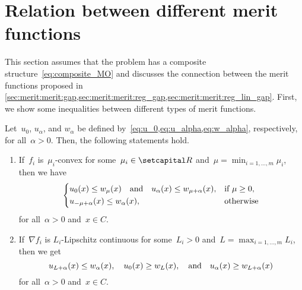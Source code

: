 \documentclass[../main]{subfiles}
\begin{document}
\section{Relation between different merit functions}
This section assumes that the problem has a composite structure~\cref{eq:composite_MO} and discusses the connection between the merit functions proposed in \cref{sec:merit:merit:gap,sec:merit:merit:reg_gap,sec:merit:merit:reg_lin_gap}.
First, we show some inequalities between different types of merit functions.
\begin{theorem} \label{thm:merit between}
    Let~$u_0$, $u_\alpha$, and $w_\alpha$ be defined by~\cref{eq:u_0,eq:u_alpha,eq:w_alpha}, respectively, for all~$\alpha > 0$.
    Then, the following statements hold.
    \begin{enumerate}
        \item If~$f_i$ is~$\mu_i$-convex for some~$\mu_i \in \setR$ and~$\mu = \min_{i = 1, \dots, m} \mu_i$, then we have
            \[
                \begin{dcases}
                    u_0(x) \le w_\mu(x) \quad \text{and} \quad u_\alpha(x) \le w_{\mu + \alpha}(x), & \text{if } \mu \ge 0, \\
                    u_{- \mu + \alpha}(x) \le w_\alpha(x), & \text{otherwise}
                \end{dcases}
            \]
            for all~$\alpha > 0$ and~$x \in C$. \label{enum:merit between convex}

        \item If~$\nabla f_i$ is $L_i$-Lipschitz continuous for some~$L_i > 0$ and~$L = \max_{i = 1, \dots, m} L_i$, then we get
            \[
                u_{L + \alpha}(x) \le w_\alpha(x), \quad u_0(x) \ge w_L(x), \quad \text{and} \quad u_\alpha(x) \ge w_{L + \alpha}(x)
            \]
            for all~$\alpha > 0$ and~$x \in C$.
            \label{enum:merit between Lipschitz}
    \end{enumerate}
\end{theorem}
\end{document}

